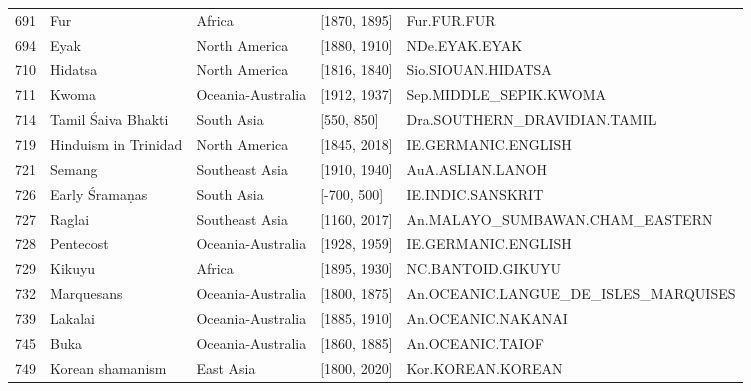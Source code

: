 {\begin{longtable}{rp{3.5cm}llp{3.5cm}}
691 & {\raggedright Fur} & Africa & [1870, 1895] & {\raggedright Fur.\allowbreak{}FUR.\allowbreak{}FUR} \\
694 & {\raggedright Eyak} & North America & [1880, 1910] & {\raggedright NDe.\allowbreak{}EYAK.\allowbreak{}EYAK} \\
710 & {\raggedright Hidatsa} & North America & [1816, 1840] & {\raggedright Sio.\allowbreak{}SIOUAN.\allowbreak{}HIDATSA} \\
711 & {\raggedright Kwoma} & Oceania-Australia & [1912, 1937] & {\raggedright Sep.\allowbreak{}MIDDLE\_\allowbreak{}SEPIK.\allowbreak{}KWOMA} \\
714 & {\raggedright Tamil Śaiva Bhakti} & South Asia & [550, 850] & {\raggedright Dra.\allowbreak{}SOUTHERN\_\allowbreak{}DRAVIDIAN.\allowbreak{}TAMIL} \\
719 & {\raggedright Hinduism in Trinidad} & North America & [1845, 2018] & {\raggedright IE.\allowbreak{}GERMANIC.\allowbreak{}ENGLISH} \\
721 & {\raggedright Semang} & Southeast Asia & [1910, 1940] & {\raggedright AuA.\allowbreak{}ASLIAN.\allowbreak{}LANOH} \\
726 & {\raggedright Early Śramaṇas} & South Asia & [-700, 500] & {\raggedright IE.\allowbreak{}INDIC.\allowbreak{}SANSKRIT} \\
727 & {\raggedright Raglai} & Southeast Asia & [1160, 2017] & {\raggedright An.\allowbreak{}MALAYO\_\allowbreak{}SUMBAWAN.\allowbreak{}CHAM\_\allowbreak{}EASTERN} \\
728 & {\raggedright Pentecost} & Oceania-Australia & [1928, 1959] & {\raggedright IE.\allowbreak{}GERMANIC.\allowbreak{}ENGLISH} \\
729 & {\raggedright Kikuyu} & Africa & [1895, 1930] & {\raggedright NC.\allowbreak{}BANTOID.\allowbreak{}GIKUYU} \\
732 & {\raggedright Marquesans} & Oceania-Australia & [1800, 1875] & {\raggedright An.\allowbreak{}OCEANIC.\allowbreak{}LANGUE\_\allowbreak{}DE\_\allowbreak{}ISLES\_\allowbreak{}MARQUISES} \\
739 & {\raggedright Lakalai} & Oceania-Australia & [1885, 1910] & {\raggedright An.\allowbreak{}OCEANIC.\allowbreak{}NAKANAI} \\
745 & {\raggedright Buka} & Oceania-Australia & [1860, 1885] & {\raggedright An.\allowbreak{}OCEANIC.\allowbreak{}TAIOF} \\
749 & {\raggedright Korean shamanism} & East Asia & [1800, 2020] & {\raggedright Kor.\allowbreak{}KOREAN.\allowbreak{}KOREAN} \\

\end{longtable}}
